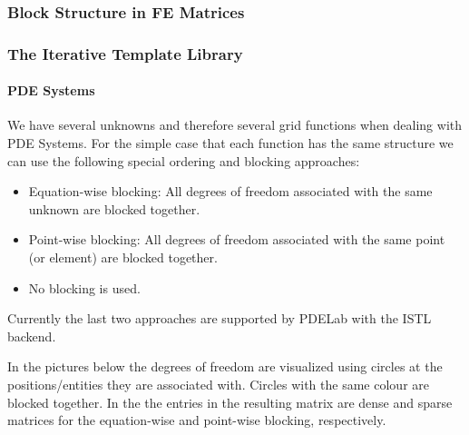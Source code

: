 \subsubsection{Block Structure in FE Matrices}
\label{sec:motivation}
\begin{frame} \frametitle{The Iterative Template Library}
  \framesubtitle{PDE Systems}
  \begin{block}{}
      We have several unknowns and therefore several grid functions
      when dealing with PDE Systems.
      For the simple case that each function has the same structure we
      can use the following special ordering and blocking approaches:
  \begin{itemize}
  \item Equation-wise blocking: All degrees of freedom associated with
    the same unknown are blocked together.
  \item Point-wise blocking: All degrees of freedom associated with
    the same point (or element) are blocked together.
  \item No blocking is used.
  \end{itemize}
  \end{block}
  Currently the last two approaches are supported by PDELab with the
  ISTL backend.
\end{frame}
In the pictures below the degrees of freedom are visualized using
circles at the positions/entities they are associated with. Circles
with the same colour are blocked together. In the the entries in the
resulting matrix are dense and sparse matrices for the equation-wise
and point-wise blocking, respectively.

